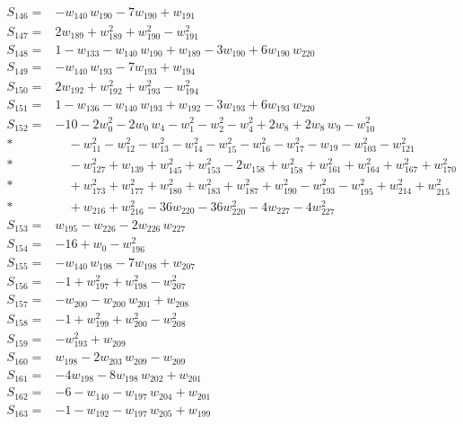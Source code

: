\begin{align*}
S_{146}={}& -w_{140}\,w_{190} - 7w_{190} + w_{191} \\[2pt]
S_{147}={}& 2w_{189} + w_{189}^{2} + w_{190}^{2} - w_{191}^{2} \\[2pt]
S_{148}={}& 1 - w_{133} - w_{140}\,w_{190} + w_{189} - 3w_{190} + 6w_{190}\,w_{220} \\[2pt]
S_{149}={}& -w_{140}\,w_{193} - 7w_{193} + w_{194} \\[2pt]
S_{150}={}& 2w_{192} + w_{192}^{2} + w_{193}^{2} - w_{194}^{2} \\[2pt]
S_{151}={}& 1 - w_{136} - w_{140}\,w_{193} + w_{192} - 3w_{193} + 6w_{193}\,w_{220} \\[2pt]
S_{152}={}& -10 - 2w_{0}^{2} - 2w_{0}\,w_{4} - w_{1}^{2} - w_{2}^{2} - w_{4}^{2} + 2w_{8} + 2w_{8}\,w_{9} - w_{10}^{2} \\*
&\quad  - w_{11}^{2} - w_{12}^{2} - w_{13}^{2} - w_{14}^{2} - w_{15}^{2} - w_{16}^{2} - w_{17}^{2} - w_{19} - w_{103}^{2} - w_{121}^{2} \\*
&\quad  - w_{127}^{2} + w_{139} + w_{145}^{2} + w_{153}^{2} - 2w_{158} + w_{158}^{2} + w_{161}^{2} + w_{164}^{2} + w_{167}^{2} + w_{170}^{2} \\*
&\quad  + w_{173}^{2} + w_{177}^{2} + w_{180}^{2} + w_{183}^{2} + w_{187}^{2} + w_{190}^{2} - w_{193}^{2} - w_{195}^{2} + w_{214}^{2} + w_{215}^{2} \\*
&\quad  + w_{216} + w_{216}^{2} - 36w_{220} - 36w_{220}^{2} - 4w_{227} - 4w_{227}^{2} \\[2pt]
S_{153}={}& w_{195} - w_{226} - 2w_{226}\,w_{227} \\[2pt]
S_{154}={}& -16 + w_{0} - w_{196}^{2} \\[2pt]
S_{155}={}& -w_{140}\,w_{198} - 7w_{198} + w_{207} \\[2pt]
S_{156}={}& -1 + w_{197}^{2} + w_{198}^{2} - w_{207}^{2} \\[2pt]
S_{157}={}& -w_{200} - w_{200}\,w_{201} + w_{208} \\[2pt]
S_{158}={}& -1 + w_{199}^{2} + w_{200}^{2} - w_{208}^{2} \\[2pt]
S_{159}={}& -w_{193}^{2} + w_{209} \\[2pt]
S_{160}={}& w_{198} - 2w_{203}\,w_{209} - w_{209} \\[2pt]
S_{161}={}& -4w_{198} - 8w_{198}\,w_{202} + w_{201} \\[2pt]
S_{162}={}& -6 - w_{140} - w_{197}\,w_{204} + w_{201} \\[2pt]
S_{163}={}& -1 - w_{192} - w_{197}\,w_{205} + w_{199} \\[2pt]

\end{align*}
